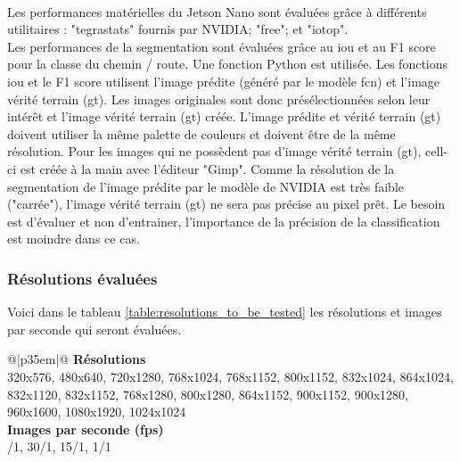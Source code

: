 \vspace{\baselineskip}
\\
\noindent Les performances matérielles du Jetson Nano sont évaluées grâce à différents utilitaires : "tegrastats" fournis par NVIDIA; "free"; et "iotop".
\vspace{\baselineskip}
\\
\noindent Les performances de la segmentation sont évaluées grâce au \acrshort{iou} et au F1 score pour la classe du chemin / route. Une fonction Python est utilisée. Les fonctions \acrshort{iou} et le F1 score utilisent l'image prédite (généré par le modèle \acrshort{fcn}) et l'image vérité terrain (\acrshort{gt}). Les images originales sont donc présélectionnées selon leur intérêt et l'image vérité terrain (\acrshort{gt}) créée. L'image prédite et vérité terrain (\acrshort{gt}) doivent utiliser la même palette de couleurs et doivent être de la même résolution. Pour les images qui ne possèdent pas d'image vérité terrain (\acrshort{gt}), cell-ci est créée à la main avec l'éditeur "Gimp". Comme la résolution de la segmentation de l'image prédite par le modèle de NVIDIA est très faible ("carrée"), l'image vérité terrain (\acrshort{gt}) ne sera pas précise au pixel prêt. Le besoin est d'évaluer et non d'entrainer, l'importance de la précision de la classification est moindre dans ce cas. 
\subsubsection{Résolutions évaluées}\label{section:resolutions_to_be_tested}
Voici dans le tableau \ref{table:resolutions_to_be_tested} les résolutions et images par seconde qui seront évaluées. 
{
    \renewcommand*{\arraystretch}{1.4}
    \begin{table}[ht]
    \centering
    \caption{Résolutions et images par seconde (\acrshort{fps}) qui seront évaluées}\label{table:resolutions_to_be_tested}
    \vspace{0.1em} %
    \begin{tabular}{{@{}|p{35em}|@{}}}
         \hline
         \textbf{Résolutions}\\
         \hline
        320x576, 480x640, 720x1280, 768x1024, 768x1152, 800x1152, 832x1024, 864x1024, 832x1120, 832x1152, 768x1280, 800x1280, 864x1152, 900x1152, 900x1280, 960x1600, 1080x1920, 1024x1024\\
        \hline
        \textbf{Images par seconde (\acrshort{fps}) }\\
        /1, 30/1, 15/1, 1/1\\
        \hline
    \end{tabular}
    \end{table}
}